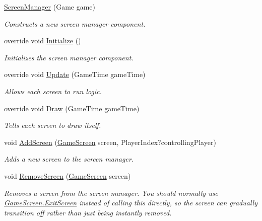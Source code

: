 \begin{DoxyCompactItemize}
\item 
\hyperlink{classCityMania_1_1TEMP_1_1ScreenManager_ace76a27fd3ec41aaec4de35b39776e8a}{ScreenManager} (Game game)
\begin{DoxyCompactList}\small\item\em Constructs a new screen manager component. \item\end{DoxyCompactList}\item 
override void \hyperlink{classCityMania_1_1TEMP_1_1ScreenManager_a066e176e641ea365b4d20798d0588296}{Initialize} ()
\begin{DoxyCompactList}\small\item\em Initializes the screen manager component. \item\end{DoxyCompactList}\item 
override void \hyperlink{classCityMania_1_1TEMP_1_1ScreenManager_a29bb9d9173fc172bb748520434bb9956}{Update} (GameTime gameTime)
\begin{DoxyCompactList}\small\item\em Allows each screen to run logic. \item\end{DoxyCompactList}\item 
override void \hyperlink{classCityMania_1_1TEMP_1_1ScreenManager_a032f7787468dfbcc4d130cc53bd9f480}{Draw} (GameTime gameTime)
\begin{DoxyCompactList}\small\item\em Tells each screen to draw itself. \item\end{DoxyCompactList}\item 
void \hyperlink{classCityMania_1_1TEMP_1_1ScreenManager_afcb90267a7dd2ba71a8a61da4dd100f4}{AddScreen} (\hyperlink{classCityMania_1_1GameScreen}{GameScreen} screen, PlayerIndex?controllingPlayer)
\begin{DoxyCompactList}\small\item\em Adds a new screen to the screen manager. \item\end{DoxyCompactList}\item 
void \hyperlink{classCityMania_1_1TEMP_1_1ScreenManager_a89569f0a358ed32c83beed2913194a88}{RemoveScreen} (\hyperlink{classCityMania_1_1GameScreen}{GameScreen} screen)
\begin{DoxyCompactList}\small\item\em Removes a screen from the screen manager. You should normally use \hyperlink{classCityMania_1_1GameScreen_ada4a6b75da175b4286662d888eefc3e2}{GameScreen.ExitScreen} instead of calling this directly, so the screen can gradually transition off rather than just being instantly removed. \item\end{DoxyCompactList}\item 

\end{DoxyCompactItemize}
